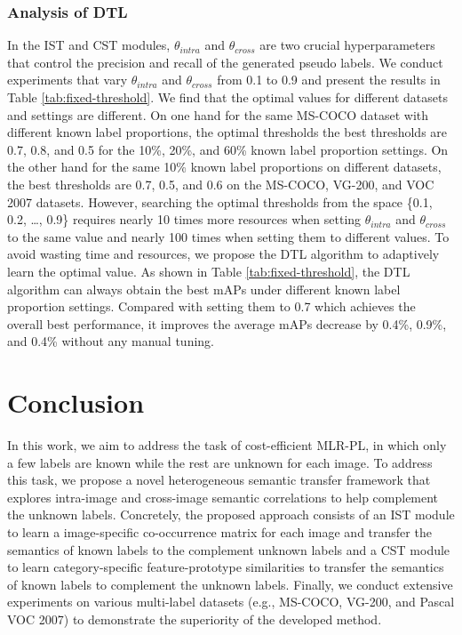 \subsubsection{Analysis of DTL}
\label{sec:exp-dtl}
In the IST and CST modules, $\theta_{intra}$ and $\theta_{cross}$ are two crucial hyperparameters that control the precision and recall of the generated pseudo labels. We conduct experiments that vary $\theta_{intra}$ and $\theta_{cross}$ from 0.1 to 0.9 and present the results in Table \ref{tab:fixed-threshold}. We find that the optimal values for different datasets and settings are different. On one hand for the same MS-COCO dataset with different known label proportions, the optimal thresholds the best thresholds are 0.7, 0.8, and 0.5 for the 10\%, 20\%, and 60\% known label proportion settings. On the other hand for the same 10\% known label proportions on different datasets, the best thresholds are 0.7, 0.5, and 0.6 on the MS-COCO, VG-200, and VOC 2007 datasets. However, searching the optimal thresholds from the space \{0.1, 0.2, \dots, 0.9\} requires nearly 10 times more resources when setting $\theta_{intra}$ and $\theta_{cross}$ to the same value and nearly 100 times when setting them to different values. To avoid wasting time and resources, we propose the DTL algorithm to adaptively learn the optimal value. As shown in Table \ref{tab:fixed-threshold}, the DTL algorithm can always obtain the best mAPs under different known label proportion settings. Compared with setting them to 0.7 which achieves the overall best performance, it improves the average mAPs decrease by 0.4\%, 0.9\%, and 0.4\% without any manual tuning.





\section{Conclusion}
\label{sec:conclusion}
In this work, we aim to address the task of cost-efficient MLR-PL, in which only a few labels are known while the rest are unknown for each image. To address this task, we propose a novel heterogeneous semantic transfer framework that explores intra-image and cross-image semantic correlations to help complement the unknown labels. Concretely, the proposed approach consists of an IST module to learn a image-specific co-occurrence matrix for each image and transfer the semantics of known labels to the complement unknown labels and a CST module to learn category-specific feature-prototype similarities to transfer the semantics of known labels to complement the unknown labels. Finally, we conduct extensive experiments on various multi-label datasets (e.g., MS-COCO, VG-200, and Pascal VOC 2007) to demonstrate the superiority of the developed method.

